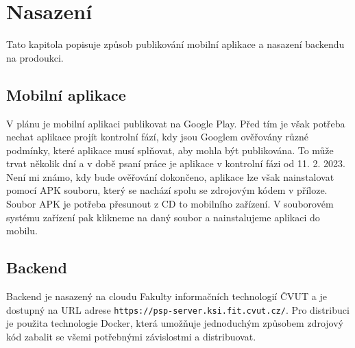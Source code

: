 \chapter{Nasazení}

\begin{chapterabstract}
	Tato kapitola popisuje způsob publikování mobilní aplikace a nasazení backendu na prodoukci.
\end{chapterabstract}

\section{Mobilní aplikace}
V plánu je mobilní aplikaci publikovat na Google Play. Před tím je však potřeba nechat aplikace projít kontrolní fází, kdy jsou Googlem ověřovány různé podmínky, které aplikace musí splňovat, aby mohla být publikována. To může trvat několik dní a v době psaní práce je aplikace v kontrolní fázi od 11. 2. 2023. Není mi známo, kdy bude ověřování dokončeno, aplikace lze však nainstalovat pomocí APK souboru, který se nachází spolu se zdrojovým kódem v příloze. Soubor APK je potřeba přesunout z CD to mobilního zařízení. V souborovém systému zařízení pak klikneme na daný soubor a nainstalujeme aplikaci do mobilu.

\section{Backend}
Backend je nasazený na cloudu Fakulty informačních technologií ČVUT a je dostupný na URL adrese \texttt{https://psp-server.ksi.fit.cvut.cz/}. Pro distribuci je použita technologie Docker, která umožňuje jednoduchým způsobem zdrojový kód zabalit se všemi potřebnými závislostmi a distribuovat.